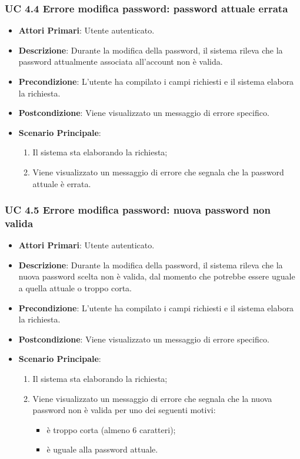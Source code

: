 			\subsubsection{UC 4.4 Errore modifica password: password attuale errata}
			\begin{itemize}
				\item \textbf{Attori Primari}: Utente autenticato.
				\item \textbf{Descrizione}: Durante la modifica della password, il sistema rileva che la password attualmente associata all'account non è valida.
				\item \textbf{Precondizione}: L'utente ha compilato i campi richiesti e il sistema elabora la richiesta.
				\item \textbf{Postcondizione}: Viene visualizzato un messaggio di errore specifico.
				\item \textbf{Scenario Principale}:
				\begin{enumerate}
					\item Il sistema sta elaborando la richiesta;
					\item Viene visualizzato un messaggio di errore che segnala che la password attuale è errata.
				\end{enumerate}
			\end{itemize}

			\subsubsection{UC 4.5 Errore modifica password: nuova password non valida}
			\begin{itemize}
				\item \textbf{Attori Primari}: Utente autenticato.
				\item \textbf{Descrizione}: Durante la modifica della password, il sistema rileva che la nuova password scelta non è valida, dal momento che potrebbe essere uguale a quella attuale o troppo corta.
				\item \textbf{Precondizione}: L'utente ha compilato i campi richiesti e il sistema elabora la richiesta.
				\item \textbf{Postcondizione}: Viene visualizzato un messaggio di errore specifico.
				\item \textbf{Scenario Principale}:
				\begin{enumerate}
					\item Il sistema sta elaborando la richiesta;
					\item Viene visualizzato un messaggio di errore che segnala che la nuova password non è valida per uno dei seguenti motivi:
					\begin{itemize}
						\item è troppo corta (almeno 6 caratteri);
						\item è uguale alla password attuale.
					\end{itemize}
				\end{enumerate}
			\end{itemize}

